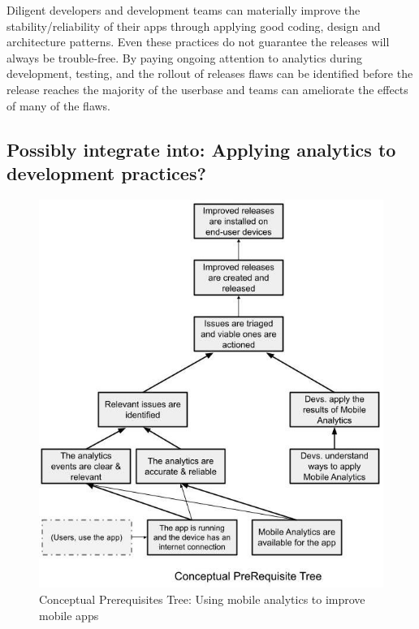 Diligent developers and development teams can materially improve the stability/reliability of their apps through applying good coding, design and architecture patterns. Even these practices do not guarantee the releases will always be trouble-free. By paying ongoing attention to analytics during development, testing, and the rollout of releases flaws can be identified before the release reaches the majority of the userbase and teams can ameliorate the effects of many of the flaws.

\clearpage 
\subsection{Possibly integrate into: Applying analytics to development practices?}
\begin{figure}
    \centering
    \includegraphics[width=12.5cm]{images/my/Conceptual_prereq_tree_Applying_Theory_of_Constraints_to_using_Mobile_Analytics_to_improve_Mobile_Apps.jpeg}
    \caption{Conceptual Prerequisites Tree: Using mobile analytics to improve mobile apps}
    \label{fig:using-toc-cpt-using-mobile-analytics-to-improve-mobile-apps}
\end{figure}

